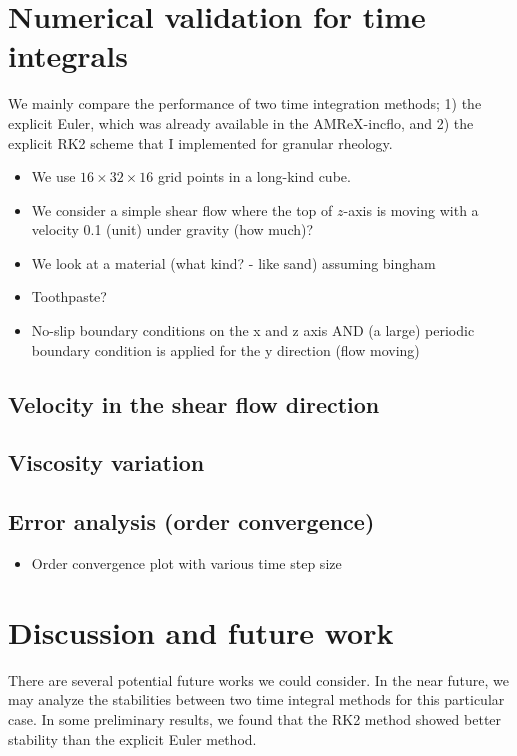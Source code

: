 \section{Numerical validation for time integrals}
We mainly compare the performance of two time integration methods; 1) the explicit Euler, which was already available in the AMReX-incflo, and 2) the explicit RK2 scheme that I implemented for granular rheology.
\begin{itemize}
  \item We use $16 \times 32 \times 16$ grid points in a long-kind cube.
  \item We consider a simple shear flow where the top of $z$-axis is moving with a velocity 0.1 (unit) under gravity (how much)?  \item We look at a material (what kind? - like sand) assuming bingham 
  \item Toothpaste?
  \item No-slip boundary conditions on the x and z axis AND (a large) periodic boundary condition is applied for the y direction (flow moving)
\end{itemize}
\subsection{Velocity in the shear flow direction}
\subsection{Viscosity variation}


\subsection{Error analysis (order convergence)}
\begin{itemize}
  \item Order convergence plot with various time step size 
\end{itemize}

\section{Discussion and future work}
There are several potential future works we could consider. 
In the near future, we may analyze the stabilities between two time integral methods for this particular case.
In some preliminary results, we found that the RK2 method showed better stability than the explicit Euler method. 

